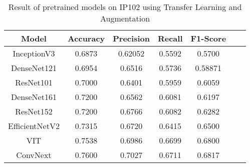 \begin{table}[!htbp]
\centering
\begin{tabular}{|c|c|c|c|c|c|c|}
\hline
\textbf{Model} & \textbf{Accuracy} & \textbf{Precision} & \textbf{Recall} & \textbf{F1-Score}\\
\hline
InceptionV3 & 0.6873 & 0.62052 & 0.5592 & 0.5700\\
DenseNet121 & 0.6954 & 0.6516 & 0.5736 & 0.58871\\
ResNet101 & 0.7000 & 0.6401 & 0.5959 & 0.6059\\
DenseNet161 & 0.7200 & 0.6562 & 0.6081 & 0.6197\\
ResNet152 & 0.7200 & 0.6766 & 0.6082 & 0.6282\\
EfficientNetV2 & 0.7315 & 0.6720 & 0.6415 & 0.6500\\
VIT & 0.7538 & 0.6986 & 0.6699 & 0.6800\\
ConvNext & 0.7600 & 0.7027 & 0.6711 & 0.6817\\
\hline
\end{tabular}
\caption{Result of pretrained models on IP102 using Transfer Learning and Augmentation}
\end{table}